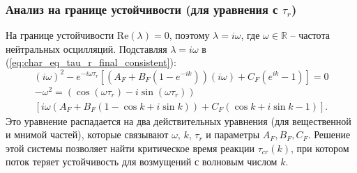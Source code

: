 \documentclass[12pt, a4paper]{article}
\begin{document}
\subsubsection{Анализ на границе устойчивости (для уравнения с $\tau_r$)}
На границе устойчивости $\text{Re}(\lambda) = 0$, поэтому $\lambda = i\omega$, где $\omega \in \mathbb{R}$ – частота нейтральных осцилляций.
Подставляя $\lambda = i\omega$ в (\ref{eq:char_eq_tau_r_final_consistent}):
\[ (i\omega)^2 - e^{-i\omega \tau_r} \left[ (A_F + B_F(1 - e^{-ik}))(i\omega) + C_F(e^{ik}-1) \right] = 0 \]
\begin{multline*}
-\omega^2 = (\cos(\omega \tau_r) - i\sin(\omega \tau_r)) \\
\left[ i\omega (A_F + B_F(1 - \cos k + i \sin k)) + C_F(\cos k + i \sin k - 1) \right].
\end{multline*}
Это уравнение распадается на два действительных уравнения (для вещественной и мнимой частей), которые связывают $\omega$, $k$, $\tau_r$ и параметры $A_F, B_F, C_F$. Решение этой системы позволяет найти критическое время реакции $\tau_{cr}(k)$, при котором поток теряет устойчивость для возмущений с волновым числом $k$.
\end{document}
